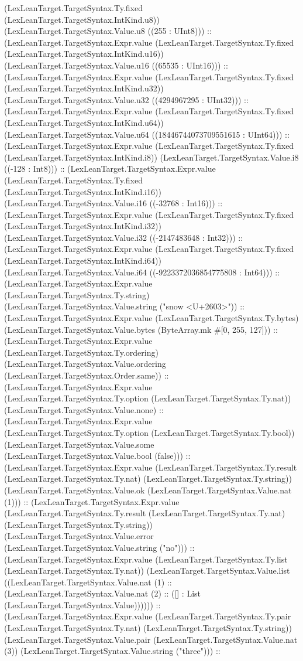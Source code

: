 \documentclass[11pt]{article}
\begin{document}
(LexLeanTarget.TargetSyntax.Ty.fixed (LexLeanTarget.TargetSyntax.IntKind.u8)) (LexLeanTarget.TargetSyntax.Value.u8 ((255 : UInt8))) :: (LexLeanTarget.TargetSyntax.Expr.value (LexLeanTarget.TargetSyntax.Ty.fixed (LexLeanTarget.TargetSyntax.IntKind.u16)) (LexLeanTarget.TargetSyntax.Value.u16 ((65535 : UInt16))) :: (LexLeanTarget.TargetSyntax.Expr.value (LexLeanTarget.TargetSyntax.Ty.fixed (LexLeanTarget.TargetSyntax.IntKind.u32)) (LexLeanTarget.TargetSyntax.Value.u32 ((4294967295 : UInt32))) :: (LexLeanTarget.TargetSyntax.Expr.value (LexLeanTarget.TargetSyntax.Ty.fixed (LexLeanTarget.TargetSyntax.IntKind.u64)) (LexLeanTarget.TargetSyntax.Value.u64 ((18446744073709551615 : UInt64))) :: (LexLeanTarget.TargetSyntax.Expr.value (LexLeanTarget.TargetSyntax.Ty.fixed (LexLeanTarget.TargetSyntax.IntKind.i8)) (LexLeanTarget.TargetSyntax.Value.i8 ((-128 : Int8))) :: (LexLeanTarget.TargetSyntax.Expr.value (LexLeanTarget.TargetSyntax.Ty.fixed (LexLeanTarget.TargetSyntax.IntKind.i16)) (LexLeanTarget.TargetSyntax.Value.i16 ((-32768 : Int16))) :: (LexLeanTarget.TargetSyntax.Expr.value (LexLeanTarget.TargetSyntax.Ty.fixed (LexLeanTarget.TargetSyntax.IntKind.i32)) (LexLeanTarget.TargetSyntax.Value.i32 ((-2147483648 : Int32))) :: (LexLeanTarget.TargetSyntax.Expr.value (LexLeanTarget.TargetSyntax.Ty.fixed (LexLeanTarget.TargetSyntax.IntKind.i64)) (LexLeanTarget.TargetSyntax.Value.i64 ((-9223372036854775808 : Int64))) :: (LexLeanTarget.TargetSyntax.Expr.value (LexLeanTarget.TargetSyntax.Ty.string) (LexLeanTarget.TargetSyntax.Value.string ("snow <U+2603>")) :: (LexLeanTarget.TargetSyntax.Expr.value (LexLeanTarget.TargetSyntax.Ty.bytes) (LexLeanTarget.TargetSyntax.Value.bytes (ByteArray.mk \#[0, 255, 127])) :: (LexLeanTarget.TargetSyntax.Expr.value (LexLeanTarget.TargetSyntax.Ty.ordering) (LexLeanTarget.TargetSyntax.Value.ordering (LexLeanTarget.TargetSyntax.Order.same)) :: (LexLeanTarget.TargetSyntax.Expr.value (LexLeanTarget.TargetSyntax.Ty.option (LexLeanTarget.TargetSyntax.Ty.nat)) (LexLeanTarget.TargetSyntax.Value.none) :: (LexLeanTarget.TargetSyntax.Expr.value (LexLeanTarget.TargetSyntax.Ty.option (LexLeanTarget.TargetSyntax.Ty.bool)) (LexLeanTarget.TargetSyntax.Value.some (LexLeanTarget.TargetSyntax.Value.bool (false))) :: (LexLeanTarget.TargetSyntax.Expr.value (LexLeanTarget.TargetSyntax.Ty.result (LexLeanTarget.TargetSyntax.Ty.nat) (LexLeanTarget.TargetSyntax.Ty.string)) (LexLeanTarget.TargetSyntax.Value.ok (LexLeanTarget.TargetSyntax.Value.nat (1))) :: (LexLeanTarget.TargetSyntax.Expr.value (LexLeanTarget.TargetSyntax.Ty.result (LexLeanTarget.TargetSyntax.Ty.nat) (LexLeanTarget.TargetSyntax.Ty.string)) (LexLeanTarget.TargetSyntax.Value.error (LexLeanTarget.TargetSyntax.Value.string ("no"))) :: (LexLeanTarget.TargetSyntax.Expr.value (LexLeanTarget.TargetSyntax.Ty.list (LexLeanTarget.TargetSyntax.Ty.nat)) (LexLeanTarget.TargetSyntax.Value.list ((LexLeanTarget.TargetSyntax.Value.nat (1) :: (LexLeanTarget.TargetSyntax.Value.nat (2) :: ([] : List (LexLeanTarget.TargetSyntax.Value)))))) :: (LexLeanTarget.TargetSyntax.Expr.value (LexLeanTarget.TargetSyntax.Ty.pair (LexLeanTarget.TargetSyntax.Ty.nat) (LexLeanTarget.TargetSyntax.Ty.string)) (LexLeanTarget.TargetSyntax.Value.pair (LexLeanTarget.TargetSyntax.Value.nat (3)) (LexLeanTarget.TargetSyntax.Value.string ("three"))) :: 
\end{document}
